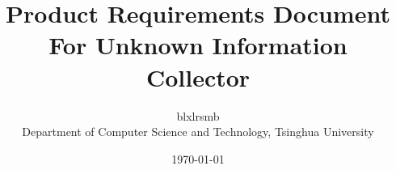 \documentclass[10pt,a4paper]{article}
\begin{document}
\title{\huge Product Requirements Document\\\Large For Unknown Information Collector}
\author{\small blxlrsmb\\
	\small Department of Computer Science and Technology, Tsinghua University}
\date{\small \today}
\maketitle

\end{document}
